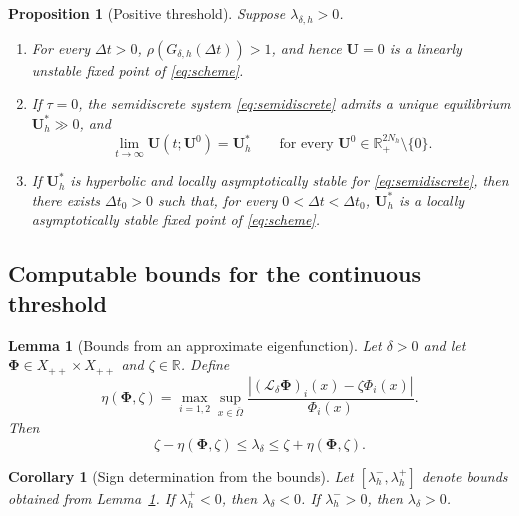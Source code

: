 \documentclass[11pt]{article}
\newtheorem{lemma}[theorem]{Lemma}
\newtheorem{proposition}[theorem]{Proposition}
\newtheorem{corollary}[theorem]{Corollary}
\theoremstyle{definition}
\newcommand{\R}{\mathbb{R}}
\newcommand{\cL}{\mathcal{L}}
\newcommand{\U}{\bm U}
\newcommand{\PhiV}{\bm\Phi}
\begin{document}
\begin{proposition}[Positive threshold]
\label{prop:positive-threshold}
Suppose $\lambda_{\delta,h}>0$.
\begin{enumerate}[label=(\roman*)]
\item For every $\Delta t>0$, $\rho(G_{\delta,h}(\Delta t))>1$, and hence $\U=0$ is a linearly unstable fixed point of \eqref{eq:scheme}.

\item If $\tau=0$, the semidiscrete system \eqref{eq:semidiscrete} admits a unique equilibrium $\U_h^*\gg0$, and
\[
 \lim_{t\to\infty}\U(t;\U^0)=\U_h^*
 \qquad\text{for every }\U^0\in\R_+^{2N_h}\setminus\{0\}.
\]

\item If $\U_h^*$ is hyperbolic and locally asymptotically stable for
\eqref{eq:semidiscrete}, then there exists $\Delta t_0>0$ such that,
for every $0<\Delta t<\Delta t_0$, $\U_h^*$ is a locally asymptotically
stable fixed point of \eqref{eq:scheme}.
\end{enumerate}
\end{proposition}

\subsection{Computable bounds for the continuous threshold}

\begin{lemma}[Bounds from an approximate eigenfunction]
\label{lem:residual-cont}
Let $\delta>0$ and let $\PhiV\in X_{++}\times X_{++}$ and $\zeta\in\R$.  Define
\begin{equation}
\label{eq:eta-cont}
 \eta(\PhiV,\zeta)
 =
 \max_{i=1,2}\sup_{x\in\overline\Omega}
 \frac{|(\cL_\delta\PhiV)_i(x)-\zeta\Phi_i(x)|}{\Phi_i(x)}.
\end{equation}
Then
\begin{equation}
\label{eq:residual-interval}
 \zeta-\eta(\PhiV,\zeta)
 \le\lambda_\delta
 \le\zeta+\eta(\PhiV,\zeta).
\end{equation}
\end{lemma}

\begin{corollary}[Sign determination from the bounds]
\label{cor:sign-interval}
Let $[\lambda_h^-,\lambda_h^+]$ denote bounds obtained from Lemma~\ref{lem:residual-cont}.  If $\lambda_h^+<0$, then $\lambda_\delta<0$.  If $\lambda_h^->0$, then $\lambda_\delta>0$.
\end{corollary}
\end{document}
